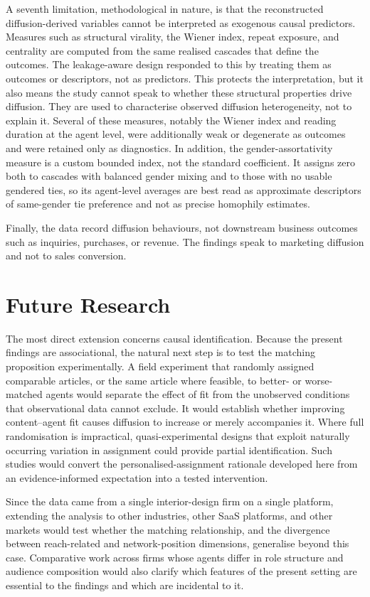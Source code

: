 A seventh limitation, methodological in nature, is that the reconstructed diffusion-derived variables cannot be interpreted as exogenous causal predictors. Measures such as structural virality, the Wiener index, repeat exposure, and centrality are computed from the same realised cascades that define the outcomes. The leakage-aware design responded to this by treating them as outcomes or descriptors, not as predictors. This protects the interpretation, but it also means the study cannot speak to whether these structural properties drive diffusion. They are used to characterise observed diffusion heterogeneity, not to explain it. Several of these measures, notably the Wiener index and reading duration at the agent level, were additionally weak or degenerate as outcomes and were retained only as diagnostics. In addition, the gender-assortativity measure is a custom bounded index, not the standard coefficient. It assigns zero both to cascades with balanced gender mixing and to those with no usable gendered ties, so its agent-level averages are best read as approximate descriptors of same-gender tie preference and not as precise homophily estimates.

Finally, the data record diffusion behaviours, not downstream business outcomes such as inquiries, purchases, or revenue. The findings speak to marketing diffusion and not to sales conversion.

\section{Future Research}
\label{sec:8-3-future-research}

The most direct extension concerns causal identification. Because the present findings are associational, the natural next step is to test the matching proposition experimentally. A field experiment that randomly assigned comparable articles, or the same article where feasible, to better- or worse-matched agents would separate the effect of fit from the unobserved conditions that observational data cannot exclude. It would establish whether improving content–agent fit causes diffusion to increase or merely accompanies it. Where full randomisation is impractical, quasi-experimental designs that exploit naturally occurring variation in assignment could provide partial identification. Such studies would convert the personalised-assignment rationale developed here from an evidence-informed expectation into a tested intervention.

Since the data came from a single interior-design firm on a single platform, extending the analysis to other industries, other SaaS platforms, and other markets would test whether the matching relationship, and the divergence between reach-related and network-position dimensions, generalise beyond this case. Comparative work across firms whose agents differ in role structure and audience composition would also clarify which features of the present setting are essential to the findings and which are incidental to it.

